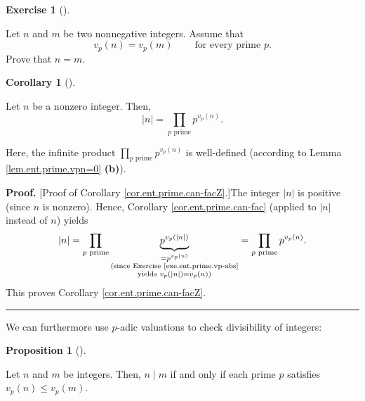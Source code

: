 \documentclass[numbers=enddot,12pt,final,onecolumn,notitlepage]{scrartcl}%
\newcounter{exer}
\numberwithin{exer}{subsection}
\theoremstyle{definition}
\newtheorem{prop}[theo]{Proposition}
\newenvironment{proposition}[1][]
{\begin{prop}[#1]\begin{leftbar}}
{\end{leftbar}\end{prop}}
\newtheorem{coro}[theo]{Corollary}
\newenvironment{corollary}[1][]
{\begin{coro}[#1]\begin{leftbar}}
{\end{leftbar}\end{coro}}
\newtheorem{exmp}[exer]{Exercise}
\newenvironment{exercise}[1][]
{\begin{exmp}[#1]\begin{leftbar}}
{\end{leftbar}\end{exmp}}
\newenvironment{proof}[1][Proof]{\noindent\textbf{#1.} }{\ \rule{0.5em}{0.5em}}
\let\prodnonlimits\prod
\renewcommand{\prod}{\prodnonlimits\limits}
\begin{document}
\begin{exercise}
\label{exe.ent.prime.vp=vp}Let $n$ and $m$ be two nonnegative integers. Assume
that
\begin{equation}
v_{p}\left(  n\right)  =v_{p}\left(  m\right)  \ \ \ \ \ \ \ \ \ \ \text{for
every prime }p. \label{eq.exe.ent.prime.vp=vp.ass}%
\end{equation}
Prove that $n=m$.
\end{exercise}

\begin{corollary}
\label{cor.ent.prime.can-facZ}Let $n$ be a nonzero integer. Then,%
\[
\left\vert n\right\vert =\prod_{p\text{ prime}}p^{v_{p}\left(  n\right)  }.
\]


Here, the infinite product $\prod_{p\text{ prime}}p^{v_{p}\left(  n\right)  }$
is well-defined (according to Lemma \ref{lem.ent.prime.vpn=0} \textbf{(b)}).
\end{corollary}

\begin{proof}
[Proof of Corollary \ref{cor.ent.prime.can-facZ}.]The integer $\left\vert
n\right\vert $ is positive (since $n$ is nonzero). Hence, Corollary
\ref{cor.ent.prime.can-fac} (applied to $\left\vert n\right\vert $ instead of
$n$) yields%
\[
\left\vert n\right\vert =\prod_{p\text{ prime}}\underbrace{p^{v_{p}\left(
\left\vert n\right\vert \right)  }}_{\substack{=p^{v_{p}\left(  n\right)
}\\\text{(since Exercise \ref{exe.ent.prime.vp-abs}}\\\text{yields }%
v_{p}\left(  \left\vert n\right\vert \right)  =v_{p}\left(  n\right)
\text{)}}}=\prod_{p\text{ prime}}p^{v_{p}\left(  n\right)  }.
\]
This proves Corollary \ref{cor.ent.prime.can-facZ}.
\end{proof}

We can furthermore use $p$-adic valuations to check divisibility of integers:

\begin{proposition}
\label{prop.ent.prime.n|m}Let $n$ and $m$ be integers. Then, $n\mid m$ if and
only if each prime $p$ satisfies $v_{p}\left(  n\right)  \leq v_{p}\left(
m\right)  $.
\end{proposition}
\end{document}
